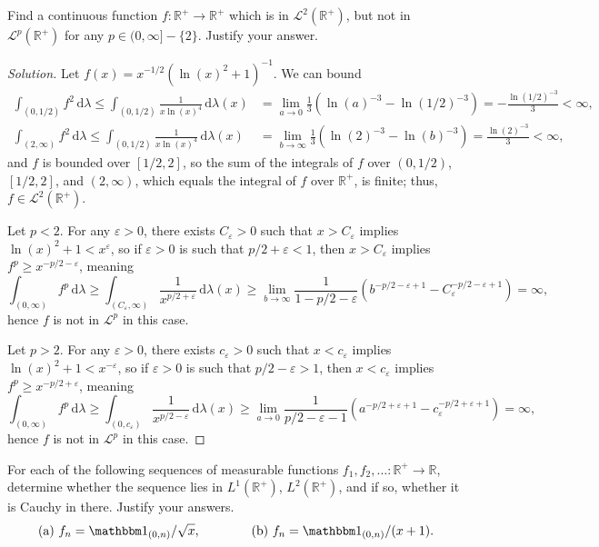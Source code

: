 \documentclass[10pt]{article}
\newcommand{\dd}{\,\mathrm{d}}
\providecommand{\eps}{\varepsilon}
\providecommand{\RR}{\mathbb R}
\providecommand{\ind}{\mathbbm 1}
\newenvironment{soln}{\begin{proof}[Solution]}{\end{proof}}
\begin{document}
\begin{problem}
    Find a continuous function $f\colon\RR^+\to\RR^+$
    which is in $\mathcal L^2(\RR^+)$, but not in $\mathcal L^p(\RR^+)$
    for any $p\in(0,\infty] - \{2\}$. Justify your answer.
\end{problem}

\begin{soln}
    Let $f(x) = x^{-1/2}(\ln(x)^2 + 1)^{-1}$.
    We can bound
    \begin{align*}
	\int_{(0,1/2)} f^2\dd\lambda \le
	\int_{(0,1/2)} \frac{1}{x\ln(x)^4}\dd\lambda(x)
	&= \lim_{a\to 0} \frac 13(\ln(a)^{-3} - \ln(1/2)^{-3})
	= -\frac{\ln(1/2)^{-3}}3 < \infty,\\
	\int_{(2,\infty)} f^2\dd\lambda \le
	\int_{(0,1/2)} \frac{1}{x\ln(x)^4}\dd\lambda(x)
	&= \lim_{b\to \infty} \frac 13(\ln(2)^{-3} - \ln(b)^{-3})
	= \frac{\ln(2)^{-3}}3 < \infty,
    \end{align*}
    and $f$ is bounded over $[1/2,2]$, so the sum of the integrals of $f$
    over $(0,1/2)$, $[1/2,2]$, and $(2,\infty)$,
    which equals the integral of $f$ over $\RR^+$, is finite;
    thus, $f\in \mathcal L^2(\RR^+)$.

    Let $p < 2$. For any $\eps>0$,
    there exists $C_\eps>0$ such that $x>C_\eps$ implies
    $\ln(x)^2 + 1 < x^\eps$, so if $\eps>0$ is such that $p/2 + \eps < 1$,
    then $x > C_\eps$ implies $f^p \ge x^{-p/2 - \eps}$, meaning
    \begin{equation*}
	\int_{(0,\infty)}f^p\dd\lambda
	\ge \int_{(C_\eps,\infty)} \frac 1{x^{p/2+\eps}}\dd\lambda(x)
	\ge \lim_{b\to\infty}\frac{1}{1 - p/2 - \eps}
	(b^{-p/2-\eps+1} - C_\eps^{-p/2-\eps+1}) = \infty,
    \end{equation*}
    hence $f$ is not in $\mathcal L^p$ in this case.

    Let $p > 2$. For any $\eps>0$,
    there exists $c_\eps>0$ such that $x < c_\eps$ implies
    $\ln(x)^2 + 1 < x^{-\eps}$, so if $\eps>0$ is such that $p/2 - \eps > 1$,
    then $x < c_\eps$ implies $f^p \ge x^{-p/2+\eps}$, meaning
    \begin{equation*}
	\int_{(0,\infty)}f^p\dd\lambda
	\ge \int_{(0,c_\eps)} \frac 1{x^{p/2-\eps}}\dd\lambda(x)
	\ge \lim_{a\to0}\frac{1}{p/2-\eps-1}
	(a^{-p/2+\eps+1} - c_\eps^{-p/2+\eps+1}) = \infty,
    \end{equation*}
    hence $f$ is not in $\mathcal L^p$ in this case.
\end{soln}

\begin{problem}
    For each of the following sequences of measurable functions
    $f_1,f_2,\ldots\colon\RR^+\to\RR$, determine whether
    the sequence lies in $L^1(\RR^+)$, $L^2(\RR^+)$, and if so,
    whether it is Cauchy in there. Justify your answers.
    \begin{equation*}
	\text{(a) }f_n = \ind_{(0,n)}/\sqrt x,\qquad\qquad
	\text{(b) }f_n = \ind_{(0,n)}/(x+1).
    \end{equation*}
\end{problem}
\end{document}
